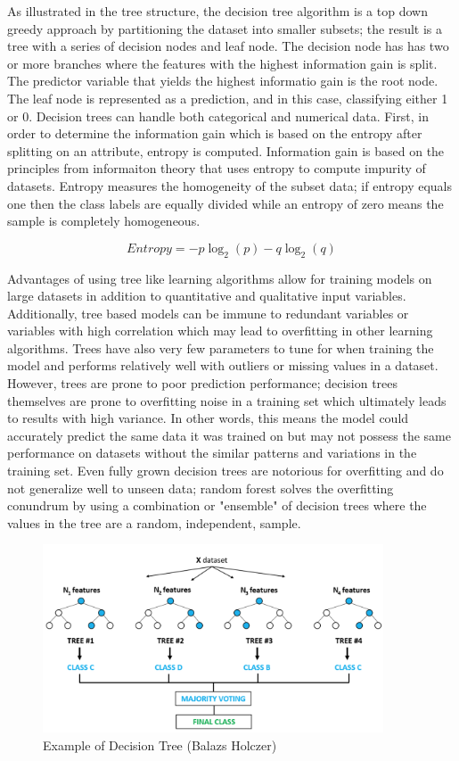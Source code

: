 \documentclass{llncs}
\begin{document}
As illustrated in the tree structure, the decision tree algorithm is a top down greedy approach by partitioning the dataset into smaller subsets; the result is a tree with a series of decision nodes and leaf node. The decision node has has two or more branches where the features with the highest information gain is split. The predictor variable that yields the highest informatio gain is the root node. The leaf node is represented as a prediction, and in this case, classifying either 1 or 0. Decision trees can handle both categorical and numerical data. First, in order to determine the information gain which is based on the entropy after splitting on an attribute, entropy is computed. Information gain is based on the principles from informaiton theory that uses entropy to compute impurity of datasets. Entropy measures the homogeneity of the subset data; if entropy equals one then the class labels are equally divided while an entropy of zero means the sample is completely homogeneous. 


\begin{equation}
Entropy = -p\log_{2}(p) - q\log_{2}(q)
\end{equation}


Advantages of using tree like learning algorithms allow for training models on large datasets in addition to quantitative and qualitative input variables. Additionally, tree based models can be immune to redundant variables or variables with high correlation which may lead to overfitting in other learning algorithms. Trees have also very few parameters to tune for when training the model and performs relatively well with outliers or missing values in a dataset. However, trees are prone to poor prediction performance; decision trees themselves are prone to overfitting noise in a training set which ultimately leads to results with high variance. In other words, this means the model could accurately predict the same data it was trained on but may not possess the same performance on datasets without the similar patterns and variations in the training set. Even fully grown decision trees are notorious for overfitting and do not generalize well to unseen data; random forest solves the overfitting conundrum by using a combination or "ensemble" of decision trees where the values in the tree are a random, independent, sample. 


\begin{figure}
\centering
\includegraphics[width=0.90\textwidth]{randomforest.png}
\caption{Example of Decision Tree (Balazs Holczer)}
\end{figure}
\end{document}
